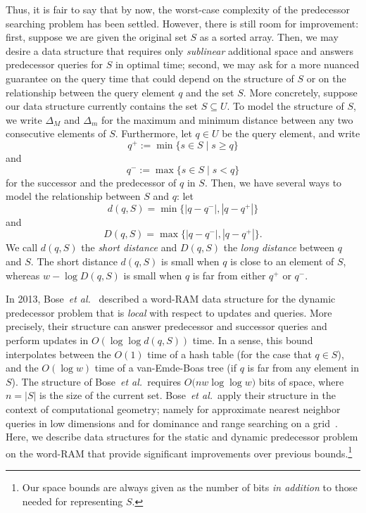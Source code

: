 \documentclass[a4paper,11pt]{article}
\newcommand{\etal}{\emph{et al.}\xspace}
\newcommand{\?}{\mskip1.5mu}
\begin{document}
Thus, it is fair to say that by now, 
the worst-case complexity of the predecessor 
searching problem has been settled. However, there is 
still room for improvement: first, suppose we are 
given the original set $S$ as a sorted array. Then,
we may desire a data structure that requires 
only \emph{sublinear} additional space and answers
predecessor queries for $S$ in optimal time; second, 
we may ask for a more nuanced guarantee on the query 
time that could depend on the structure of $S$ or on 
the relationship between the query element $q$ and 
the set $S$. More concretely, suppose our data 
structure currently contains the set $S \subseteq U$. 
To model the structure of $S$, we write $\Delta_M$ 
and $\Delta_m$ for the maximum and minimum distance 
between any two consecutive elements of $S$.
Furthermore, let $q \in U$ be the query element,  
and write
\[
  q^+ := \min\{s \in S \mid s \geq q \}
\]
and
\[
q^- := \max\{s \in S \mid s < q \}
\] 
for the 
successor and the predecessor of $q$ in $S$.
Then, we have several ways to model the
relationship between $S$ and $q$: 
let 
\[
d(q, S) = \min\big\{|q - q^-|, |q - q^+|\big\}
\]
and 
\[
D(q, S) = \max\big\{|q - q^-|, |q - q^+|\big\}.
\]
We call $d(q,S)$ the \emph{short distance} and 
$D(q, S)$ the \emph{long distance} between $q$ and 
$S$.
The short distance $d(q, S)$ is small when $q$ is 
close to an element of $S$, whereas $w - \log D(q, S)$
is small when $q$ is far from either $q^+$
or $q^-$. 

In 2013, Bose~\etal~\cite{BoseDoDuHoMo13} described
a word-RAM data structure for the dynamic predecessor
problem that is \emph{local} with respect to updates
and queries.
More precisely, their structure can answer predecessor 
and successor queries and perform updates 
in $O(\log\log d(q, S))$ time.
In a sense, this bound interpolates between
the $O(1)$ time of a hash table (for the
case that $q \in S$), and the $O(\log w)$ 
time of a van-Emde-Boas tree (if $q$ is far from
any element in $S$).
The structure of Bose~\etal~requires $O\big(n w \log\log w)$ bits 
of space, where $n = |S|$ is the size of the 
current set. Bose~\etal~apply their structure in 
the context of computational geometry; 
namely for approximate nearest 
neighbor queries in low dimensions and for 
dominance and range searching on a grid~\cite{BoseDoDuHoMo13}.
Here, we describe data structures for the
static and dynamic predecessor problem
on the word-RAM that provide significant 
improvements over previous bounds.\footnote{Our 
space bounds are always given as the
number of bits \emph{in addition} to those needed for 
representing $S$.} 
\end{document}
